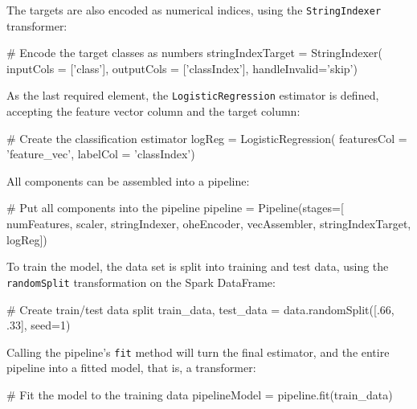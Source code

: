 The targets are also encoded as numerical indices, using the \texttt{StringIndexer} transformer:

\begin{samepage}
\begin{pythoncode}
# Encode the target classes as numbers
stringIndexTarget = StringIndexer(
    inputCols = ['class'],
    outputCols = ['classIndex'],
    handleInvalid='skip')
\end{pythoncode}    
\end{samepage}

As the last required element, the \texttt{LogisticRegression} estimator is defined, accepting the feature vector column and the target column:

\begin{samepage}
\begin{pythoncode}
# Create the classification estimator
logReg = LogisticRegression(
    featuresCol = 'feature_vec', labelCol = 'classIndex')
\end{pythoncode}
\end{samepage}
All components can be assembled into a pipeline:

\begin{samepage}
\begin{pythoncode}
# Put all components into the pipeline
pipeline = Pipeline(stages=[
    numFeatures,
    scaler,
    stringIndexer,
    oheEncoder,
    vecAssembler,
    stringIndexTarget,
    logReg])
\end{pythoncode}
\end{samepage}

To train the model, the data set is split into training and test data, using the \texttt{randomSplit} transformation on the Spark DataFrame:

\begin{samepage}
\begin{pythoncode}
# Create train/test data split
train_data, test_data = data.randomSplit([.66, .33], seed=1)
\end{pythoncode}
\end{samepage}

Calling the pipeline's \texttt{fit} method will turn the final estimator, and the entire pipeline into a fitted model, that is, a transformer:

\begin{samepage}
\begin{pythoncode}
# Fit the model to the training data
pipelineModel = pipeline.fit(train_data)
\end{pythoncode}
\end{samepage}

